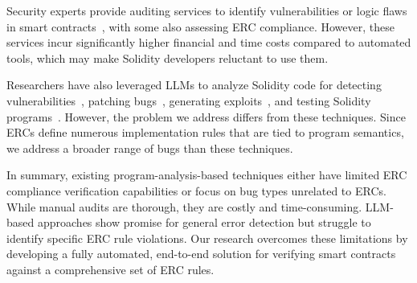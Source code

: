 Security experts provide auditing services to identify 
vulnerabilities or logic flaws 
in smart 
contracts~\cite{certik,revoluzion,pixelplex,blockhunters,immunebytes,antier,humanaudited}, with some also assessing ERC compliance. 
However, these services incur significantly higher financial and time 
costs compared to automated tools, which may make Solidity 
developers reluctant to use them.

Researchers have also leveraged
LLMs to analyze Solidity code for 
detecting vulnerabilities~\cite{sun2023gpt, ma2024combiningfinetuningllmbasedagents}, 
patching bugs~\cite{ibbaleveraging}, generating exploits~\cite{wu2024advscanner}, 
and testing Solidity programs~\cite{alici2023openai}. However, the problem we address differs from these techniques. Since ERCs define numerous implementation rules that are tied to program semantics, 
we address a broader range of bugs than these techniques.

In summary, existing program-analysis-based 
techniques either have limited ERC compliance 
verification capabilities 
or focus on bug types unrelated to ERCs. 
While manual audits are thorough, they are costly and 
time-consuming. LLM-based approaches show promise for 
general error detection but struggle to identify 
specific ERC rule violations. Our research overcomes 
these limitations by developing a fully automated, end-to-end solution for verifying smart contracts against a
comprehensive set of ERC rules.






